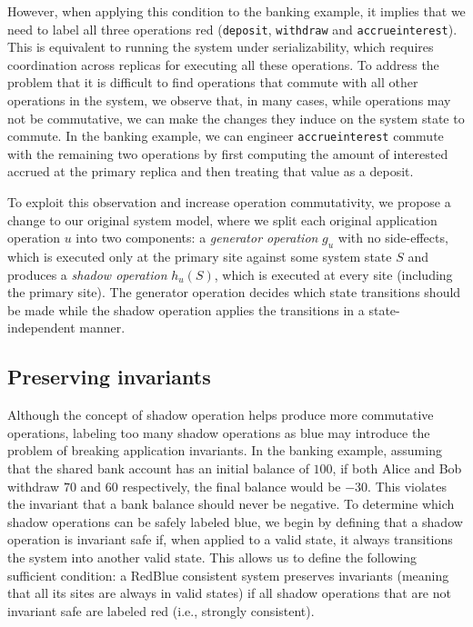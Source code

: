 \documentclass[11pt]{article}
\begin{document}
However, when applying this condition to the banking example, it implies that we need to label all three operations red
({\tt deposit}, {\tt withdraw} and {\tt accrueinterest}).
This is equivalent to running the system under serializability, which requires coordination across replicas for executing all these operations.
To address the problem that it is difficult to find operations that commute with all other operations in the system, we observe that, in many cases,
while operations may not be commutative, we
can make the changes they induce on the system state to commute. In
the banking example, we can engineer {\tt accrueinterest} commute with the remaining two operations
by first computing the amount of interested accrued at the primary replica and then treating that value as a deposit.


To exploit this observation and increase operation commutativity, we propose a change to our
original system model,
where we split each original application operation $u$
into two components: a {\em generator operation} $g_u$ with no
side-effects, which is executed only at the primary site against some
system state $S$ and produces a {\em shadow operation} $h_u(S)$,
which is executed at every site (including the primary site). The
generator operation decides which state transitions should be made
while the shadow operation applies the transitions in a
state-indep\-endent manner.

\subsection{Preserving invariants}
Although the concept of shadow operation helps produce more commutative operations, labeling too many
shadow operations as blue may introduce the problem of breaking application invariants. In the banking example, assuming that the shared bank account has an initial balance of $100$, if both Alice and Bob withdraw $70$ and $60$ respectively,
the final balance would be $-30$. This violates the
invariant that a bank balance should never be negative. To determine which shadow
operations can be safely labeled blue, we begin by defining that a
shadow operation is invariant safe if, when applied to a valid state, it always transitions
the system into another valid state. This allows us to define the following
sufficient condition: a RedBlue consistent system preserves invariants (meaning that all its sites are always in valid states) if all shadow operations that are not invariant safe are labeled red (i.e., strongly consistent).
\end{document}
